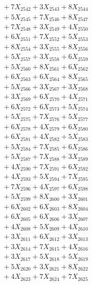 \documentclass[a4paper,10pt]{article}
\begin{document}
{\begin{align}
&\;  + 7 X_{2542} + 3 X_{2543} + 8 X_{2544} \\[0.3ex]
&\;  + 5 X_{2545} + 7 X_{2546} + 8 X_{2547} \\[0.3ex]
&\;  + 7 X_{2548} + 3 X_{2549} + 4 X_{2550} \\[0.3ex]
&\;  + 6 X_{2551} + 7 X_{2552} + 5 X_{2553} \\[0.3ex]
&\;  + 8 X_{2554} + 3 X_{2555} + 8 X_{2556} \\[0.3ex]
&\;  + 5 X_{2557} + 3 X_{2558} + 6 X_{2559} \\[0.5ex]\allowbreak
&\;  + 5 X_{2560} + 8 X_{2561} + 6 X_{2562} \\[0.3ex]
&\;  + 6 X_{2563} + 6 X_{2564} + 8 X_{2565} \\[0.3ex]
&\;  + 5 X_{2566} + 3 X_{2567} + 3 X_{2568} \\[0.3ex]
&\;  + 3 X_{2569} + 6 X_{2570} + 4 X_{2571} \\[0.3ex]
&\;  + 6 X_{2572} + 6 X_{2573} + 5 X_{2574} \\[0.3ex]
&\;  + 5 X_{2575} + 7 X_{2576} + 5 X_{2577} \\[0.3ex]
&\;  + 6 X_{2578} + 4 X_{2579} + 6 X_{2580} \\[0.3ex]
&\;  + 6 X_{2581} + 4 X_{2582} + 5 X_{2583} \\[0.3ex]
&\;  + 5 X_{2584} + 7 X_{2585} + 6 X_{2586} \\[0.3ex]
&\;  + 5 X_{2587} + 7 X_{2588} + 3 X_{2589} \\[0.5ex]\allowbreak
&\;  + 4 X_{2590} + 7 X_{2591} + 6 X_{2592} \\[0.3ex]
&\;  + 4 X_{2593} + 5 X_{2594} + 7 X_{2595} \\[0.3ex]
&\;  + 7 X_{2596} + 4 X_{2597} + 6 X_{2598} \\[0.3ex]
&\;  + 5 X_{2599} + 8 X_{2600} + 3 X_{2601} \\[0.3ex]
&\;  + 6 X_{2602} + 6 X_{2603} + 8 X_{2604} \\[0.3ex]
&\;  + 6 X_{2605} + 6 X_{2606} + 3 X_{2607} \\[0.3ex]
&\;  + 4 X_{2608} + 5 X_{2609} + 4 X_{2610} \\[0.3ex]
&\;  + 3 X_{2611} + 6 X_{2612} + 3 X_{2613} \\[0.3ex]
&\;  + 3 X_{2614} + 7 X_{2615} + 4 X_{2616} \\[0.3ex]
&\;  + 3 X_{2617} + 5 X_{2618} + 5 X_{2619} \\[0.5ex]\allowbreak
&\;  + 5 X_{2620} + 3 X_{2621} + 8 X_{2622} \\[0.3ex]
&\;  + 4 X_{2623} + 7 X_{2624} + 7 X_{2625} \\[0.3ex]

\end{align}}
\end{document}
